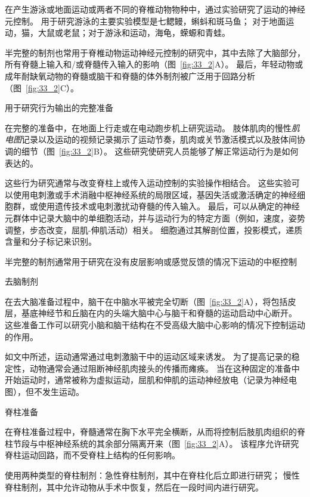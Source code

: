 \begin{proposition}[用于研究运动神经元控制的制剂] \label{box:33_1}
	
	\quad \quad 在产生游泳或地面运动或两者不同的脊椎动物物种中，通过实验研究了运动的神经元控制。
	用于研究游泳的主要实验模型是七鳃鳗，蝌蚪和斑马鱼；
	对于地面运动，猫，大鼠或老鼠；对于游泳和运动，海龟，蝾螈和青蛙。
	
	\quad \quad 半完整的制剂也常用于脊椎动物运动神经元控制的研究中，其中去除了大脑部分，所有脊髓上输入和/或脊髓传入输入的影响（图~\ref{fig:33_2}A）。
	最后，年轻动物或成年耐缺氧动物的脊髓或脑干和脊髓的体外制剂被广泛用于回路分析（图~\ref{fig:33_2}C）。
	
	\quad \quad 用于研究行为输出的完整准备
	
	\quad \quad 在完整的准备中，在地面上行走或在电动跑步机上研究运动。
	肢体肌肉的慢性\textit{肌电图}记录以及运动的视频记录揭示了运动节奏，肌肉或关节激活模式以及肢体间协调的细节（图~\ref{fig:33_2}B）。
	这些研究使研究人员能够了解正常运动行为是如何表达的。
	
	\quad \quad 这些行为研究通常与改变脊柱上或传入运动控制的实验操作相结合。
	这些实验可以使用电刺激或手术消融中枢神经系统的局限区域，基因失活或激活确定的神经细胞群，或使用遗传技术或电刺激扰动脊髓的传入输入。
	最后，可以从确定的神经元群体中记录大脑中的单细胞活动，并与运动行为的特定方面（例如，速度，姿势调整，步态改变，屈肌-伸肌活动）相关。
	细胞通过其解剖位置，投影模式，递质含量和分子标记来识别。
	
	\quad \quad 半完整的制剂通常用于研究在没有皮层影响或感觉反馈的情况下运动的中枢控制
	
	\quad \quad 去脑制剂
	
	\quad \quad 在去大脑准备过程中，脑干在中脑水平被完全切断（图~\ref{fig:33_2}A），将包括皮层，基底神经节和丘脑在内的头端大脑中心与脑干和脊髓的运动启动中心断开。
	这些准备工作可以研究小脑和脑干结构在不受高级大脑中心影响的情况下控制运动的作用。
	
	\quad \quad 如文中所述，运动通常通过电刺激脑干中的运动区域来诱发。
	为了提高记录的稳定性，动物通常会通过阻断神经肌肉接头的传播而瘫痪。
	当在这种固定的准备中开始运动时，通常被称为虚拟运动，屈肌和伸肌的运动神经放电（记录为神经电图），但不发生运动。
	
	\quad \quad 脊柱准备
	
	\quad \quad 在脊柱准备过程中，脊髓通常在胸下水平完全横断，从而将控制后肢肌肉组织的脊柱节段与中枢神经系统的其余部分隔离开来（图~\ref{fig:33_2}A）。
	该程序允许研究脊柱运动回路，而不受脊柱上结构的任何影响。
	
	\quad \quad 使用两种类型的脊柱制剂：急性脊柱制剂，其中在脊柱化后立即进行研究；
	慢性脊柱制剂，其中允许动物从手术中恢复，然后在一段时间内进行研究。
	

\end{proposition}
